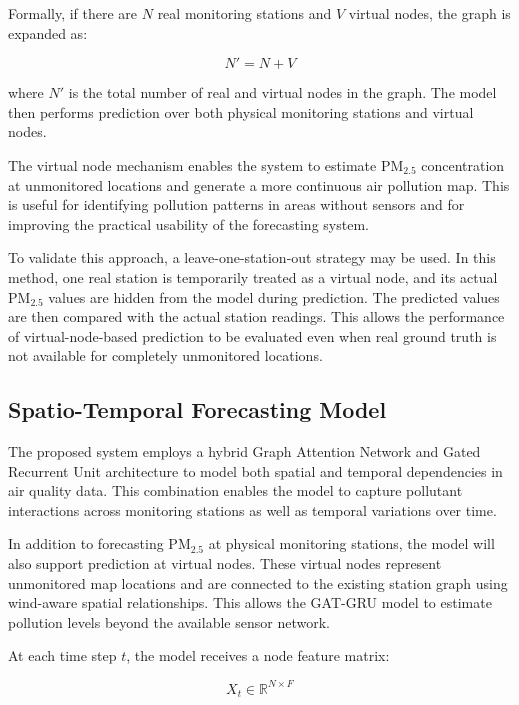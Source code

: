Formally, if there are $N$ real monitoring stations and $V$ virtual nodes, the graph is expanded as:

\begin{equation}
N' = N + V
\end{equation}

where $N'$ is the total number of real and virtual nodes in the graph. The model then performs prediction over both physical monitoring stations and virtual nodes.

The virtual node mechanism enables the system to estimate PM$_{2.5}$ concentration at unmonitored locations and generate a more continuous air pollution map. This is useful for identifying pollution patterns in areas without sensors and for improving the practical usability of the forecasting system.

To validate this approach, a leave-one-station-out strategy may be used. In this method, one real station is temporarily treated as a virtual node, and its actual PM$_{2.5}$ values are hidden from the model during prediction. The predicted values are then compared with the actual station readings. This allows the performance of virtual-node-based prediction to be evaluated even when real ground truth is not available for completely unmonitored locations.

\subsection{Spatio-Temporal Forecasting Model}

The proposed system employs a hybrid Graph Attention Network and Gated Recurrent Unit architecture to model both spatial and temporal dependencies in air quality data. This combination enables the model to capture pollutant interactions across monitoring stations as well as temporal variations over time.

In addition to forecasting PM$_{2.5}$ at physical monitoring stations, the model will also support prediction at virtual nodes. These virtual nodes represent unmonitored map locations and are connected to the existing station graph using wind-aware spatial relationships. This allows the GAT-GRU model to estimate pollution levels beyond the available sensor network.

At each time step $t$, the model receives a node feature matrix:

\begin{equation}
X_t \in \mathbb{R}^{N \times F}
\end{equation}

